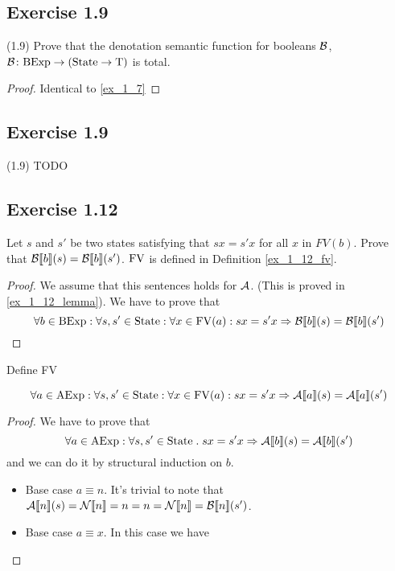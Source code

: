 \documentclass[12pt,a4paper,oneside]{book}
\begin{document}
\subsection{Exercise 1.9}

\begin{exercise}{(1.9)}
	Prove that the denotation semantic function for booleans $\mathcal{B}$, $\mathord{\mathcal{B}}\colon\mathrm{BExp}\to(\mathrm{State} \to \mathrm{T})$ is total.
	
	\begin{proof}
		Identical to \ref{ex_1_7}
	\end{proof}
\end{exercise}

\subsection{Exercise 1.9}

\begin{exercise}{(1.9)}
	TODO
\end{exercise}

\subsection{Exercise 1.12}

\begin{exercise}
	Let $s$ and $s'$ be two states satisfying that $s x = s' x$ for all $x$ in $FV(b)$. Prove that $\mathcal{B} \llbracket b \rrbracket (s) = \mathcal{B} \llbracket b \rrbracket (s')$. $\mathrm{FV}$ is defined in Definition \ref{ex_1_12_fv}.
	
	\begin{proof}
		We assume that this sentences holds for $\mathcal{A}$. (This is proved in \ref{ex_1_12_lemma}). We have to prove that
		\[
		\forall b \in \mathrm{BExp} \mathrel{:} \forall s, s' \in \mathrm{State} \mathrel{:} \forall x \in \mathrm{FV}(a) \mathrel{:} sx = s'x \Rightarrow \mathcal{B} \llbracket b \rrbracket (s) = \mathcal{B} \llbracket b \rrbracket (s')
		\]
		
	\end{proof}
	
\end{exercise}

\begin{definition}
	\label{ex_1_12_fv}
	Define FV 
\end{definition}

\begin{lemma}
	\label{ex_1_12_lemma}
	\[
	\forall a \in \mathrm{AExp} \mathrel{:} \forall s, s' \in \mathrm{State} \mathrel{:} \forall x \in \mathrm{FV}(a) \mathrel{:} sx = s'x \Rightarrow \mathcal{A} \llbracket a \rrbracket (s) = \mathcal{A} \llbracket a \rrbracket (s')
	\]
	
	\begin{proof}
		We have to prove that
		\[
		\forall a \in \mathrm{AExp} \mathrel{:} \forall s, s' \in \mathrm{State} \mathrel{.} sx = s'x \Rightarrow \mathcal{A} \llbracket b \rrbracket (s) = \mathcal{A} \llbracket b \rrbracket (s')
		\]
		and we can do it by structural induction on $b$.
		
		\begin{itemize}
			\item Base case $a \equiv n$. It's trivial to note that $\mathcal{A} \llbracket n \rrbracket (s) = \mathcal{N} \llbracket n \rrbracket = n = n = \mathcal{N} \llbracket n \rrbracket = \mathcal{B} \llbracket n \rrbracket (s')$.
			\item Base case $a \equiv x$. In this case we have
		\end{itemize}
	\end{proof}
\end{lemma}
\end{document}

